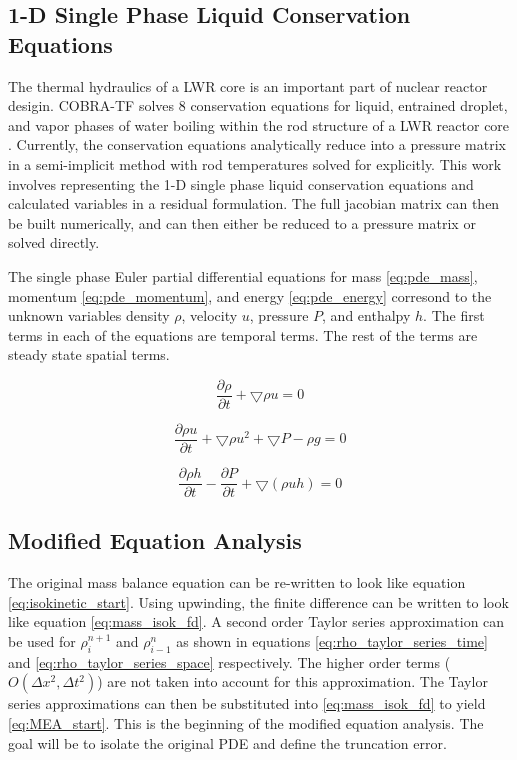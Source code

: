 \documentclass{mc2015}
\begin{document}
\subsection{1-D Single Phase Liquid Conservation Equations}

The thermal hydraulics of a LWR core is an important part of nuclear
reactor desigin. COBRA-TF solves 8 conservation equations for liquid,
entrained droplet, and vapor phases of water boiling within the rod structure
of a LWR reactor core \cite{CTF_Theory}. Currently, the conservation
equations analytically reduce into a pressure matrix in a semi-implicit
method with rod temperatures solved for explicitly. This work involves
representing the 1-D single phase liquid conservation equations and calculated 
variables in a residual formulation. The full jacobian matrix can then be
built numerically, and  can then either be reduced to a pressure matrix or
solved directly.

The single phase Euler partial differential equations for mass
\eqref{eq:pde_mass}, momentum \eqref{eq:pde_momentum}, and energy
\eqref{eq:pde_energy} corresond to the unknown variables density $\rho$,
velocity $u$, pressure $P$, and enthalpy $h$. The first terms in each of the
equations are temporal terms. The rest of the terms are steady state spatial
terms. 
    
    \begin{equation}
    	\label{eq:pde_mass}
    	\frac{ \partial \rho}{\partial t} + \bigtriangledown \rho u = 0
    \end{equation}
    
    \begin{equation}
    	\label{eq:pde_momentum}
    	\frac{ \partial \rho u}{\partial t} + \bigtriangledown \rho u^{2} +
    	\bigtriangledown P - \rho g  = 0
    \end{equation}
    
    \begin{equation}
    	\label{eq:pde_energy}
    	\frac{ \partial \rho h}{\partial t} -
    	\frac{ \partial  P}{\partial t} + 
    	\bigtriangledown ( \rho  u h )
    	= 0
    \end{equation}
    
\subsection{Modified Equation Analysis}
    
    The original mass balance equation can be re-written to 
    look like equation \ref{eq:isokinetic_start}. Using upwinding, the finite difference
    can be written to look like equation \ref{eq:mass_isok_fd}. A second order Taylor 
    series approximation can be used for $\rho_{i}^{n+1}$ and $\rho_{i-1}^{n}$ as shown 
    in equations \ref{eq:rho_taylor_series_time} and \ref{eq:rho_taylor_series_space} 
    respectively. The higher order terms ($O(\Delta x^{2},\Delta t^{2} )$) are
    not taken into account for this approximation. The Taylor series
    approximations can then be substituted into \ref{eq:mass_isok_fd} to yield
    \ref{eq:MEA_start}. This is the beginning of the modified equation analysis.
    The goal will be to isolate the original PDE and define the truncation error.
    
\end{document}
